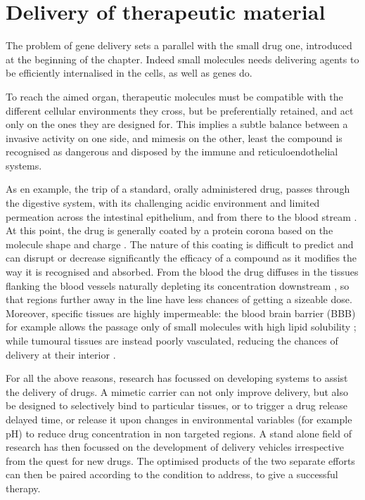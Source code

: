 \section{Delivery of therapeutic material}
The problem of gene delivery sets a parallel with the small drug one, introduced at the beginning of the chapter. Indeed small molecules needs delivering agents to be efficiently internalised in the cells, as well as genes do.

To reach the aimed organ, therapeutic molecules must be compatible with the different cellular environments they cross, but be preferentially retained, and act only on the ones they are designed for. This implies a subtle balance between a invasive activity on one side, and mimesis on the other, least the compound is recognised as dangerous and disposed by the immune and reticuloendothelial systems.

As en example, the trip of a standard, orally administered drug, passes through the digestive system, with its challenging acidic environment and limited permeation across the intestinal epithelium, and from there to the blood stream \cite{Masaoka2006, Mitragotri2014}. 
%
At this point, the drug is generally coated by a protein corona based on the molecule shape and charge \cite{Krol2012}. The nature of this coating is difficult to predict and can disrupt or decrease significantly the efficacy of a compound as it modifies the way it is recognised and absorbed.
%
From the blood the drug diffuses in the tissues flanking the blood vessels naturally depleting its concentration downstream \cite{Krol2012}, so that regions further away in the line have less chances of getting a sizeable dose. 
%
Moreover, specific tissues are highly impermeable: the blood brain barrier (BBB) for example allows the passage only of small molecules with high lipid solubility \cite{Pattni2015, Krol2012}; while tumoural tissues are instead poorly vasculated, reducing the chances of delivery at their interior \cite{Pattni2015}.

For all the above reasons, research has focussed on developing systems to assist the delivery of drugs. A mimetic carrier can not only improve delivery, but also be designed to selectively bind to particular tissues, or to trigger a drug release delayed time, or release it upon changes in environmental variables (for example pH) to reduce drug concentration in non targeted regions. A stand alone field of research has then focussed on the development of delivery vehicles irrespective from the quest for new drugs. The optimised products of the two separate efforts can then be paired according to the condition to address, to give a successful therapy.

